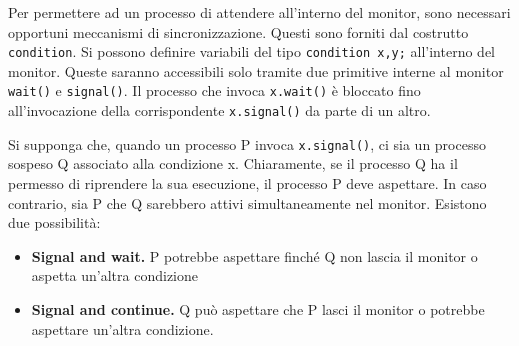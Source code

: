 \documentclass[a4paper]{article}
\begin{document}
Per permettere ad un processo di attendere all'interno del monitor, sono necessari opportuni meccanismi di sincronizzazione. Questi sono forniti dal costrutto \texttt{condition}. Si possono definire variabili del tipo \texttt{condition x,y;} all'interno del monitor. Queste saranno accessibili solo tramite due primitive interne al monitor \texttt{wait()} e \texttt{signal()}. Il processo che invoca \texttt{x.wait()} è bloccato fino all'invocazione della corrispondente \texttt{x.signal()} da parte di un altro.

Si supponga che, quando un processo P invoca \texttt{x.signal()}, ci sia un processo sospeso Q associato alla condizione x. Chiaramente, se il processo Q ha il permesso di riprendere la sua esecuzione, il processo P deve aspettare. In caso contrario, sia P che Q sarebbero attivi simultaneamente nel monitor. Esistono due possibilità:
\begin{itemize}
   \item \textbf{Signal and wait.} P potrebbe aspettare finché Q non lascia il monitor o aspetta un'altra condizione
   \item \textbf{Signal and continue.} Q può aspettare che P lasci il monitor o potrebbe aspettare un'altra condizione.
\end{itemize}
\end{document}
